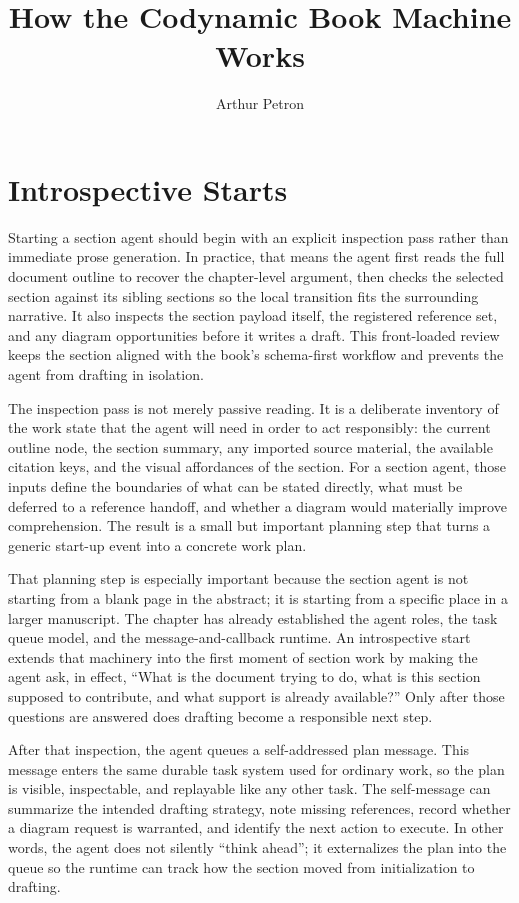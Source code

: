 \documentclass[11pt]{article}
\title{How the Codynamic Book Machine Works}
\author{Arthur Petron}
\begin{document}
\section*{Introspective Starts}

Starting a section agent should begin with an explicit inspection pass rather than immediate prose generation. In practice, that means the agent first reads the full document outline to recover the chapter-level argument, then checks the selected section against its sibling sections so the local transition fits the surrounding narrative. It also inspects the section payload itself, the registered reference set, and any diagram opportunities before it writes a draft. This front-loaded review keeps the section aligned with the book's schema-first workflow and prevents the agent from drafting in isolation.

The inspection pass is not merely passive reading. It is a deliberate inventory of the work state that the agent will need in order to act responsibly: the current outline node, the section summary, any imported source material, the available citation keys, and the visual affordances of the section. For a section agent, those inputs define the boundaries of what can be stated directly, what must be deferred to a reference handoff, and whether a diagram would materially improve comprehension. The result is a small but important planning step that turns a generic start-up event into a concrete work plan.

That planning step is especially important because the section agent is not starting from a blank page in the abstract; it is starting from a specific place in a larger manuscript. The chapter has already established the agent roles, the task queue model, and the message-and-callback runtime. An introspective start extends that machinery into the first moment of section work by making the agent ask, in effect, ``What is the document trying to do, what is this section supposed to contribute, and what support is already available?'' Only after those questions are answered does drafting become a responsible next step.

After that inspection, the agent queues a self-addressed plan message. This message enters the same durable task system used for ordinary work, so the plan is visible, inspectable, and replayable like any other task. The self-message can summarize the intended drafting strategy, note missing references, record whether a diagram request is warranted, and identify the next action to execute. In other words, the agent does not silently ``think ahead''; it externalizes the plan into the queue so the runtime can track how the section moved from initialization to drafting.
\end{document}
